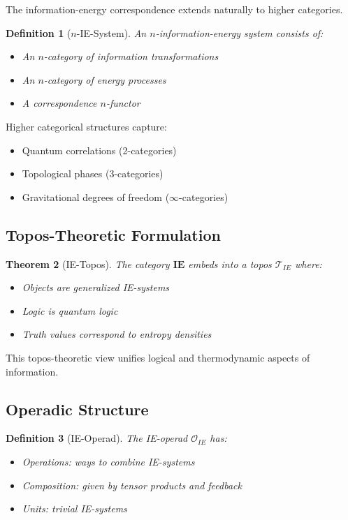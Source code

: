 \documentclass[12pt]{article}
\newtheorem{theorem}{Theorem}[section]
\newtheorem{definition}[theorem]{Definition}
\begin{document}
The information-energy correspondence extends naturally to higher categories.

\begin{definition}[$n$-IE-System]
An $n$-information-energy system consists of:
\begin{itemize}
\item An $n$-category of information transformations
\item An $n$-category of energy processes
\item A correspondence $n$-functor
\end{itemize}
\end{definition}

Higher categorical structures capture:
\begin{itemize}
\item Quantum correlations (2-categories)
\item Topological phases (3-categories)
\item Gravitational degrees of freedom ($\infty$-categories)
\end{itemize}

\subsection{Topos-Theoretic Formulation}

\begin{theorem}[IE-Topos]
The category $\mathbf{IE}$ embeds into a topos $\mathcal{T}_{IE}$ where:
\begin{itemize}
\item Objects are generalized IE-systems
\item Logic is quantum logic
\item Truth values correspond to entropy densities
\end{itemize}
\end{theorem}

This topos-theoretic view unifies logical and thermodynamic aspects of information.

\subsection{Operadic Structure}

\begin{definition}[IE-Operad]
The IE-operad $\mathcal{O}_{IE}$ has:
\begin{itemize}
\item Operations: ways to combine IE-systems
\item Composition: given by tensor products and feedback
\item Units: trivial IE-systems
\end{itemize}
\end{definition}
\end{document}
